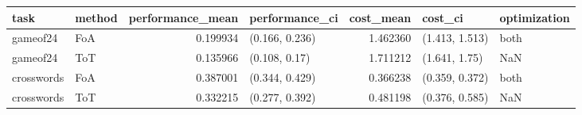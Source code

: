 \begin{tabular}{llrlrll}
\toprule
task & method & performance_mean & performance_ci & cost_mean & cost_ci & optimization \\
\midrule
gameof24 & FoA & 0.199934 & (0.166, 0.236) & 1.462360 & (1.413, 1.513) & both \\
gameof24 & ToT & 0.135966 & (0.108, 0.17) & 1.711212 & (1.641, 1.75) & NaN \\
crosswords & FoA & 0.387001 & (0.344, 0.429) & 0.366238 & (0.359, 0.372) & both \\
crosswords & ToT & 0.332215 & (0.277, 0.392) & 0.481198 & (0.376, 0.585) & NaN \\
\bottomrule
\end{tabular}
